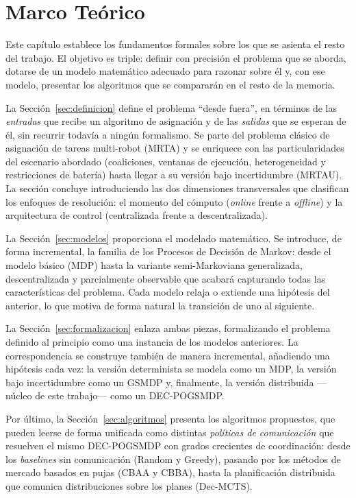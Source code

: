 \chapter{Marco Teórico}\label{cap:marco_teorico}

Este capítulo establece los fundamentos formales sobre los que se asienta el resto del trabajo. El objetivo es triple: definir con precisión el problema que se aborda, dotarse de un modelo matemático adecuado para razonar sobre él y, con ese modelo, presentar los algoritmos que se compararán en el resto de la memoria.

La Sección~\ref{sec:definicion} define el problema ``desde fuera'', en términos de las \emph{entradas} que recibe un algoritmo de asignación y de las \emph{salidas} que se esperan de él, sin recurrir todavía a ningún formalismo. Se parte del problema clásico de asignación de tareas multi-robot (MRTA) y se enriquece con las particularidades del escenario abordado (coaliciones, ventanas de ejecución, heterogeneidad y restricciones de batería) hasta llegar a su versión bajo incertidumbre (MRTAU). La sección concluye introduciendo las dos dimensiones transversales que clasifican los enfoques de resolución: el momento del cómputo (\emph{online} frente a \emph{offline}) y la arquitectura de control (centralizada frente a descentralizada).

La Sección~\ref{sec:modelos} proporciona el modelado matemático. Se introduce, de forma incremental, la familia de los Procesos de Decisión de Markov: desde el modelo básico (MDP) hasta la variante semi-Markoviana generalizada, descentralizada y parcialmente observable que acabará capturando todas las características del problema. Cada modelo relaja o extiende una hipótesis del anterior, lo que motiva de forma natural la transición de uno al siguiente.

La Sección~\ref{sec:formalizacion} enlaza ambas piezas, formalizando el problema definido al principio como una instancia de los modelos anteriores. La correspondencia se construye también de manera incremental, añadiendo una hipótesis cada vez: la versión determinista se modela como un MDP, la versión bajo incertidumbre como un GSMDP y, finalmente, la versión distribuida ---núcleo de este trabajo--- como un DEC-POGSMDP.

Por último, la Sección~\ref{sec:algoritmos} presenta los algoritmos propuestos, que pueden leerse de forma unificada como distintas \emph{políticas de comunicación} que resuelven el mismo DEC-POGSMDP con grados crecientes de coordinación: desde los \textit{baselines} sin comunicación (Random y Greedy), pasando por los métodos de mercado basados en pujas (CBAA y CBBA), hasta la planificación distribuida que comunica distribuciones sobre los planes (Dec-MCTS).


